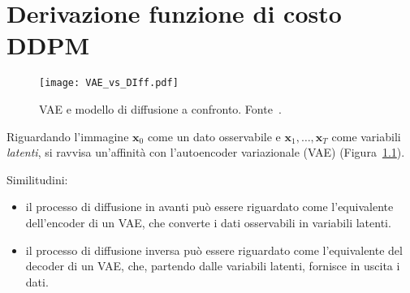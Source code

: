 \chapter{Derivazione funzione di costo DDPM}\label{appendix:details_loss}


\begin{figure}
    \centering
    \texttt{[image: VAE\_vs\_DIff.pdf]}
    \caption{VAE e modello di diffusione a confronto. Fonte~\cite{nain2022}.}
    \label{fig:VAE_vs_Diff}
\end{figure}

Riguardando l'immagine $\mathbf{x}_0$ come un dato osservabile e $\mathbf{x}_1,\dots,\mathbf{x}_T$ come variabili \emph{latenti}, 
si ravvisa un'affinità con l'autoencoder variazionale (VAE) (Figura~\ref{fig:VAE_vs_Diff}).

\medskip

\noindent Similitudini:
\begin{itemize}
\item il processo di diffusione in avanti può essere riguardato come l'equivalente dell'encoder di un VAE, che converte 
i dati osservabili in variabili latenti.
\item il processo di diffusione inversa può essere riguardato come l'equivalente del decoder di un VAE, che, partendo dalle 
variabili latenti, fornisce in uscita i dati.
\end{itemize}

